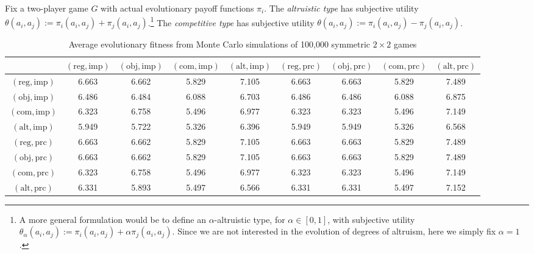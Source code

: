 \documentclass[fleqn,reqno,11pt]{article}
\begin{document}
\begin{definition} \label{defn:alttype}

  Fix a two-player game $G$ with actual evolutionary payoff functions $\pi_i$. The \textit{altruistic type}
  has subjective utility $\theta(a_i, a_j):=\pi_i(a_i,a_j) + \pi_j(a_i,a_j)$.\footnote{A
    more general formulation would be to define an $ \alpha$-altruistic type, for
    $\alpha \in [0,1]$, with subjective utility
    $ \theta_\alpha(a_i, a_j):=\pi_i(a_i,a_j) + \alpha \pi_j(a_i,a_j)$. Since we are not
    interested in the evolution of degrees of altruism, here we simply fix $ \alpha = 1 $.} The
  \emph{competitive type} has subjective utility
  $\theta(a_i, a_j):=\pi_i(a_i,a_j) - \pi_j(a_i,a_j)$.

\end{definition}



\begin{table}[]
\centering
\footnotesize
\begin{tabular}{ccccccccc}
  \hline
 & $(\text{reg}, \text{imp})$ 
 & $(\text{obj}, \text{imp})$ 
 & $(\text{com}, \text{imp})$
 & $(\text{alt}, \text{imp})$
 & $(\text{reg}, \text{prc})$ 
 & $(\text{obj}, \text{prc})$ 
 & $(\text{com}, \text{prc})$
 & $(\text{alt}, \text{prc})$ \\ 
  \hline
  $(\text{reg}, \text{imp})$ & 6.663 & 6.662 & 5.829 & 7.105 & 6.663 & 6.663 & 5.829 & 7.489 \\
  $(\text{obj}, \text{imp})$ & 6.486 & 6.484 & 6.088 & 6.703 & 6.486 & 6.486 & 6.088 & 6.875 \\
  $(\text{com}, \text{imp})$ & 6.323 & 6.758 & 5.496 & 6.977 & 6.323 & 6.323 & 5.496 & 7.149 \\
  $(\text{alt}, \text{imp})$ & 5.949 & 5.722 & 5.326 & 6.396 & 5.949 & 5.949 & 5.326 & 6.568 \\
  $(\text{reg}, \text{prc})$ & 6.663 & 6.662 & 5.829 & 7.105 & 6.663 & 6.663 & 5.829 & 7.489 \\
  $(\text{obj}, \text{prc})$ & 6.663 & 6.662 & 5.829 & 7.105 & 6.663 & 6.663 & 5.829 & 7.489 \\
  $(\text{com}, \text{prc})$ & 6.323 & 6.758 & 5.496 & 6.977 & 6.323 & 6.323 & 5.496 & 7.149 \\
  $(\text{alt}, \text{prc})$ & 6.331 & 5.893 & 5.497 & 6.566 & 6.331 & 6.331 & 5.497 & 7.152 \\
   \hline                          
\end{tabular}                      
\caption{Average evolutionary fitness from Monte Carlo simulations of 100,000 symmetric $2 \times 2$ games}
\label{tab:ExpectedFitness_2x2_Full}        
\end{table}   
 
\end{document}
